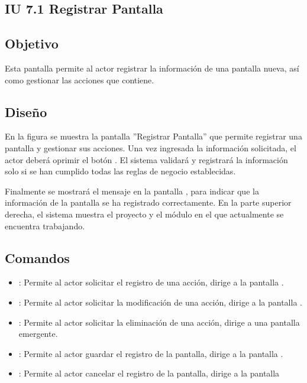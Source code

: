 \subsection{IU 7.1 Registrar Pantalla}

\subsection{Objetivo}
	Esta pantalla permite al actor registrar la información de una pantalla nueva, así como gestionar las acciones que contiene.
\subsection{Diseño}
	En la figura  se muestra la pantalla ''Registrar Pantalla'' que permite registrar una pantalla y gestionar sus acciones.
	Una vez ingresada la información solicitada, el actor deberá oprimir el botón  . El sistema validará y registrará la información solo si se han cumplido todas las reglas de negocio establecidas.
	
	Finalmente se mostrará el mensaje  en la pantalla , para indicar que la información de la pantalla se ha registrado correctamente.
	En la parte superior derecha, el sistema muestra el proyecto y el módulo en el que actualmente se encuentra trabajando.

\subsection{Comandos}
\begin{itemize}
	\item {}: Permite al actor solicitar el registro de una acción, dirige a la pantalla .
	\item \editar [Modificar]: Permite al actor solicitar la modificación de una acción, dirige a la pantalla .
	\item \eliminar [Eliminar]: Permite al actor solicitar la eliminación de una acción, dirige a una pantalla emergente.
	\item {}: Permite al actor guardar el registro de la pantalla, dirige a la pantalla .
	\item {}: Permite al actor cancelar el registro de la pantalla, dirige a la pantalla 
\end{itemize}

